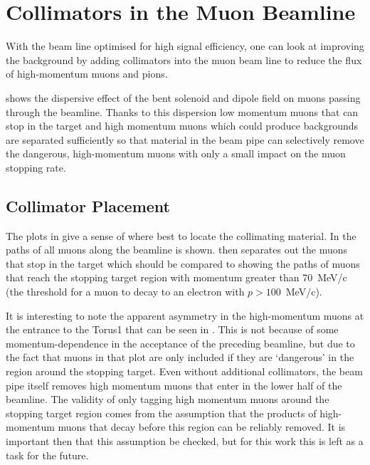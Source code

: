 \section{Collimators in the Muon Beamline}
\FigOptimMuBeamDipoleMuDispersion
With the beam line optimised for high signal efficiency, one can look at improving the background by adding collimators into the muon beam line to reduce the flux of high-momentum muons and pions.

 shows the dispersive effect of the bent solenoid and dipole field on muons passing through the beamline.
Thanks to this dispersion low momentum muons that can stop in the target and high momentum muons which could produce backgrounds are separated sufficiently so that material in the beam pipe can selectively remove the dangerous, high-momentum muons with only a small impact on the muon stopping rate.

\subsection{Collimator Placement}
\FigOptimMuBeamCollimMuonPaths
The plots in  give a sense of where best to locate the collimating material.
In  the paths of all muons along the beamline is shown.
 then separates out the muons that stop in the target which should be compared to 
 showing the paths of muons that reach the stopping target region with momentum greater than 70~MeV/c (the threshold for a muon to decay to an electron with $p>100$~MeV/c).

It is interesting to note the apparent asymmetry in the high-momentum muons at the entrance to the Torus1 that can be seen in .  
This is not because of some momentum-dependence in the acceptance of the preceding beamline, but due to the fact that muons in that plot are only included if they are `dangerous' in the region around the stopping target.
Even without additional collimators, the beam pipe itself removes high momentum muons that enter in the lower half of the beamline.
The validity of only tagging high momentum muons around the stopping target region comes from the assumption that the products of high-momentum muons that decay before this region can be reliably removed.
It is important then that this assumption be checked, but for this work this is left as a task for the future.

